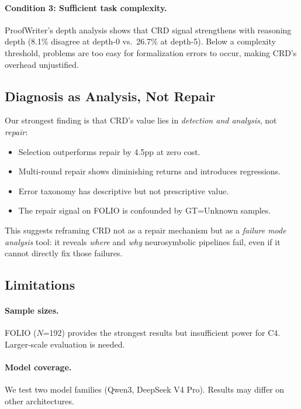 \documentclass[11pt,a4paper]{article}
\begin{document}
\paragraph{Condition 3: Sufficient task complexity.}
ProofWriter's depth analysis shows that CRD signal strengthens with reasoning depth (8.1\% disagree at depth-0 vs.\ 26.7\% at depth-5). Below a complexity threshold, problems are too easy for formalization errors to occur, making CRD's overhead unjustified.

\subsection{Diagnosis as Analysis, Not Repair}

Our strongest finding is that CRD's value lies in \textit{detection and analysis}, not \textit{repair}:

\begin{itemize}
    \item Selection outperforms repair by 4.5pp at zero cost.
    \item Multi-round repair shows diminishing returns and introduces regressions.
    \item Error taxonomy has descriptive but not prescriptive value.
    \item The repair signal on FOLIO is confounded by GT=Unknown samples.
\end{itemize}

This suggests reframing CRD not as a repair mechanism but as a \textit{failure mode analysis} tool: it reveals \textit{where} and \textit{why} neurosymbolic pipelines fail, even if it cannot directly fix those failures.

\subsection{Limitations}

\paragraph{Sample sizes.} FOLIO ($N$=192) provides the strongest results but insufficient power for C4. Larger-scale evaluation is needed.

\paragraph{Model coverage.} We test two model families (Qwen3, DeepSeek V4 Pro). Results may differ on other architectures.
\end{document}
